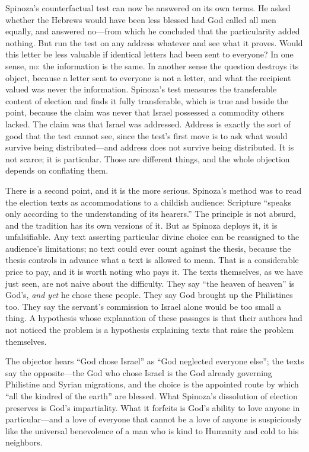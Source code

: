 Spinoza's counterfactual test can now be answered on its own terms. He asked whether the Hebrews would have been less blessed had God called all men equally, and answered no---from which he concluded that the particularity added nothing. But run the test on any address whatever and see what it proves. Would this letter be less valuable if identical letters had been sent to everyone? In one sense, no: the information is the same. In another sense the question destroys its object, because a letter sent to everyone is not a letter, and what the recipient valued was never the information. Spinoza's test measures the transferable content of election and finds it fully transferable, which is true and beside the point, because the claim was never that Israel possessed a commodity others lacked. The claim was that Israel was addressed. Address is exactly the sort of good that the test cannot see, since the test's first move is to ask what would survive being distributed---and address does not survive being distributed. It is not scarce; it is particular. Those are different things, and the whole objection depends on conflating them.

There is a second point, and it is the more serious. Spinoza's method was to read the election texts as accommodations to a childish audience: Scripture ``speaks only according to the understanding of its hearers.'' The principle is not absurd, and the tradition has its own versions of it. But as Spinoza deploys it, it is unfalsifiable. Any text asserting particular divine choice can be reassigned to the audience's limitations; no text could ever count against the thesis, because the thesis controls in advance what a text is allowed to mean. That is a considerable price to pay, and it is worth noting who pays it. The texts themselves, as we have just seen, are not naive about the difficulty. They say ``the heaven of heaven'' is God's, \emph{and yet} he chose these people. They say God brought up the Philistines too. They say the servant's commission to Israel alone would be too small a thing. A hypothesis whose explanation of these passages is that their authors had not noticed the problem is a hypothesis explaining texts that raise the problem themselves.

The objector hears ``God chose Israel'' as ``God neglected everyone else''; the texts say the opposite---the God who chose Israel is the God already governing Philistine and Syrian migrations, and the choice is the appointed route by which ``all the kindred of the earth'' are blessed. What Spinoza's dissolution of election preserves is God's impartiality. What it forfeits is God's ability to love anyone in particular---and a love of everyone that cannot be a love of anyone is suspiciously like the universal benevolence of a man who is kind to Humanity and cold to his neighbors.

